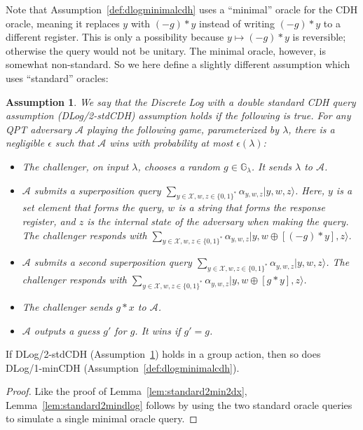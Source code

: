 \documentclass{article}\usepackage[a4paper,margin=20mm]{geometry}
\newtheorem{assumption}[theorem]{Assumption}
\numberwithin{theorem}{section}
\numberwithin{equation}{section}
\newcommand{\G}{\mathbb{G}}
\newcommand{\As}{{\mathcal{A}}}
\newcommand{\Xs}{{\mathcal{X}}}
\begin{document}
Note that Assumption~\ref{def:dlogminimalcdh} uses a ``minimal'' oracle for the CDH oracle, meaning it replaces $y$ with $(-g)*y$ instead of writing $(-g)*y$ to a different register. This is only a possibility because $y\mapsto(-g)*y$ is reversible; otherwise the query would not be unitary. The minimal oracle, however, is somewhat non-standard. So we here define a slightly different assumption which uses ``standard'' oracles:

\begin{assumption}\label{def:dlogstandardcdh} We say that the \emph{Discrete Log with a double standard CDH query} assumption (DLog/2-stdCDH) assumption holds if the following is true. For any QPT adversary $\As$ playing the following game, parameterized by $\lambda$, there is a negligible $\epsilon$ such that $\As$ wins with probability at most $\epsilon(\lambda)$:
	\begin{itemize}
		\item The challenger, on input $\lambda$, chooses a random $g\in\G_\lambda$. It sends $\lambda$ to $\As$.
		\item $\As$ submits a superposition query $\sum_{y\in\Xs,w,z\in\{0,1\}^*}\alpha_{y,w,z}|y,w,z\rangle$. Here, $y$ is a set element that forms the query, $w$ is a string that forms the response register, and $z$ is the internal state of the adversary when making the query. The challenger responds with $\sum_{y\in\Xs,w,z\in\{0,1\}^*}\alpha_{y,w,z}|y,w\oplus[(-g)*y],z\rangle$. 
		\item $\As$ submits a second superposition query $\sum_{y\in\Xs,w,z\in\{0,1\}^*}\alpha_{y,w,z}|y,w,z\rangle$. The challenger responds with $\sum_{y\in\Xs,w,z\in\{0,1\}^*}\alpha_{y,w,z}|y,w\oplus[g*y],z\rangle$. 
		\item The challenger sends $g*x$ to $\As$.
		\item $\As$ outputs a guess $g'$ for $g$. It wins if $g'=g$.
	\end{itemize}
\end{assumption}

\begin{lemma}\label{lem:standard2mindlog} If DLog/2-stdCDH (Assumption~\ref{def:dlogstandardcdh}) holds in a group action, then so does DLog/1-minCDH (Assumption~\ref{def:dlogminimalcdh}).
\end{lemma}
\begin{proof}Like the proof of Lemma~\ref{lem:standard2min2dx}, Lemma~\ref{lem:standard2mindlog} follows by using the two standard oracle queries to simulate a single minimal oracle query.\end{proof}
\end{document}
